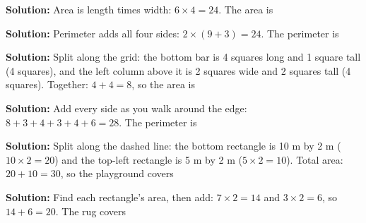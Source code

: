 \documentclass[12pt]{article}
\begin{document}



\textbf{Solution:} Area is length times width: $6 \times 4 = 24$. The area is


\textbf{Solution:} Perimeter adds all four sides: $2 \times (9 + 3) = 24$.
The perimeter is 


\textbf{Solution:} Split along the grid: the bottom bar is 4 squares long and
1 square tall (4 squares), and the left column above it is 2 squares wide and
2 squares tall (4 squares). Together: $4 + 4 = 8$, so the area is


\textbf{Solution:} Add every side as you walk around the edge:
$8 + 3 + 4 + 3 + 4 + 6 = 28$. The perimeter is 


\textbf{Solution:} Split along the dashed line: the bottom rectangle is
10 m by 2 m ($10 \times 2 = 20$) and the top-left rectangle is 5 m by 2 m
($5 \times 2 = 10$). Total area: $20 + 10 = 30$, so the playground covers


\textbf{Solution:} Find each rectangle's area, then add:
$7 \times 2 = 14$ and $3 \times 2 = 6$, so $14 + 6 = 20$. The rug covers

\end{document}
